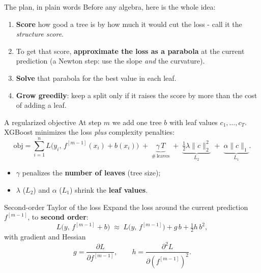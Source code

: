 \documentclass[aspectratio=169]{beamer}
\begin{document}
\begin{frame}{The plan, in plain words}
  Before any algebra, here is the whole idea:
  \begin{enumerate}
    \item \textbf{Score} how good a tree is by how much it would cut the loss - call it the
      \emph{structure score}.
    \item To get that score, \textbf{approximate the loss as a parabola} at the current prediction
      (a Newton step: use the slope \emph{and} the curvature).
    \item \textbf{Solve} that parabola for the best value in each leaf.
    \item \textbf{Grow greedily}: keep a split only if it raises the score by more than the cost of
      adding a leaf.
  \end{enumerate}
  \vfill
\end{frame}

\begin{frame}{A regularized objective}
  At step $m$ we add one tree $b$ with leaf values $c_1,\dots,c_T$. XGBoost minimizes the loss
  \emph{plus} complexity penalties:
  \[
    \mathrm{obj} = \sum_{i=1}^{n} L\big(y_i,\, f^{[m-1]}(x_i) + b(x_i)\big)
      \;+\; \underbrace{\gamma\,T}_{\#\,\text{leaves}}
      \;+\; \underbrace{\tfrac12 \lambda \|c\|_2^2}_{L_2}
      \;+\; \underbrace{\alpha \|c\|_1}_{L_1}.
  \]
  \begin{itemize}\small
    \item $\gamma$ penalizes the \textbf{number of leaves} (tree size);
    \item $\lambda$ ($L_2$) and $\alpha$ ($L_1$) shrink the \textbf{leaf values}.
  \end{itemize}
  \vfill
\end{frame}

\begin{frame}{Second-order Taylor of the loss}
  Expand the loss around the current prediction $f^{[m-1]}$, to \textbf{second order}:
  \[
    L\big(y,\, f^{[m-1]} + b\big) \;\approx\;
    L\big(y,\, f^{[m-1]}\big) + g\, b + \tfrac12 h\, b^2,
  \]
  with gradient and Hessian
  \[
    g = \frac{\partial L}{\partial f^{[m-1]}}, \qquad
    h = \frac{\partial^2 L}{\partial (f^{[m-1]})^2}.
  \]
\end{frame}
\end{document}
